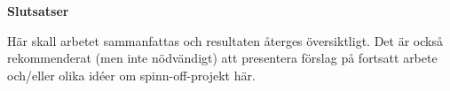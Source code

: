 \begin{mdframed}[innertopmargin=10pt, innerbottommargin=10pt, innerleftmargin=10pt, innerrightmargin=10pt, skipabove=10pt, skipbelow=10pt, roundcorner=10pt]
    \textbf{Slutsatser}
    
    Här skall arbetet sammanfattas och resultaten återges översiktligt. Det är också rekommenderat (men inte nödvändigt) att presentera förslag på fortsatt arbete och/eller olika idéer om spinn-off-projekt här.
    \end{mdframed}